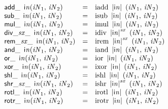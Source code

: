 \vspace{1ex}

$$
\begin{array}{@{}lcl@{}l@{}}
{{\mathsf{add}}{\mathsf{\_}}~\,{\mathsf{i}}{{\mathit{n}}}}{({\mathit{iN}}_{{1}},\, {\mathit{iN}}_{{2}})} &=& {\mathrm{iadd}}~\,{|{\mathsf{i}}{{\mathit{n}}}|}~\,({\mathit{iN}}_{{1}},\, {\mathit{iN}}_{{2}}) &  \\
{{\mathsf{sub}}{\mathsf{\_}}~\,{\mathsf{i}}{{\mathit{n}}}}{({\mathit{iN}}_{{1}},\, {\mathit{iN}}_{{2}})} &=& {\mathrm{isub}}~\,{|{\mathsf{i}}{{\mathit{n}}}|}~\,({\mathit{iN}}_{{1}},\, {\mathit{iN}}_{{2}}) &  \\
{{\mathsf{mul}}{\mathsf{\_}}~\,{\mathsf{i}}{{\mathit{n}}}}{({\mathit{iN}}_{{1}},\, {\mathit{iN}}_{{2}})} &=& {\mathrm{imul}}~\,{|{\mathsf{i}}{{\mathit{n}}}|}~\,({\mathit{iN}}_{{1}},\, {\mathit{iN}}_{{2}}) &  \\
{{{\mathsf{div\_}}{{\mathit{sx}}}}{\mathsf{\_}}~\,{\mathsf{i}}{{\mathit{n}}}}{({\mathit{iN}}_{{1}},\, {\mathit{iN}}_{{2}})} &=& {\mathrm{idiv}}~\,{{|{\mathsf{i}}{{\mathit{n}}}|}^{{\mathit{sx}}}}~\,({\mathit{iN}}_{{1}},\, {\mathit{iN}}_{{2}}) &  \\
{{{\mathsf{rem\_}}{{\mathit{sx}}}}{\mathsf{\_}}~\,{\mathsf{i}}{{\mathit{n}}}}{({\mathit{iN}}_{{1}},\, {\mathit{iN}}_{{2}})} &=& {\mathrm{irem}}~\,{{|{\mathsf{i}}{{\mathit{n}}}|}^{{\mathit{sx}}}}~\,({\mathit{iN}}_{{1}},\, {\mathit{iN}}_{{2}}) &  \\
{{\mathsf{and}}{\mathsf{\_}}~\,{\mathsf{i}}{{\mathit{n}}}}{({\mathit{iN}}_{{1}},\, {\mathit{iN}}_{{2}})} &=& {\mathrm{iand}}~\,{|{\mathsf{i}}{{\mathit{n}}}|}~\,({\mathit{iN}}_{{1}},\, {\mathit{iN}}_{{2}}) &  \\
{{\mathsf{or}}{\mathsf{\_}}~\,{\mathsf{i}}{{\mathit{n}}}}{({\mathit{iN}}_{{1}},\, {\mathit{iN}}_{{2}})} &=& {\mathrm{ior}}~\,{|{\mathsf{i}}{{\mathit{n}}}|}~\,({\mathit{iN}}_{{1}},\, {\mathit{iN}}_{{2}}) &  \\
{{\mathsf{xor}}{\mathsf{\_}}~\,{\mathsf{i}}{{\mathit{n}}}}{({\mathit{iN}}_{{1}},\, {\mathit{iN}}_{{2}})} &=& {\mathrm{ixor}}~\,{|{\mathsf{i}}{{\mathit{n}}}|}~\,({\mathit{iN}}_{{1}},\, {\mathit{iN}}_{{2}}) &  \\
{{\mathsf{shl}}{\mathsf{\_}}~\,{\mathsf{i}}{{\mathit{n}}}}{({\mathit{iN}}_{{1}},\, {\mathit{iN}}_{{2}})} &=& {\mathrm{ishl}}~\,{|{\mathsf{i}}{{\mathit{n}}}|}~\,({\mathit{iN}}_{{1}},\, {\mathit{iN}}_{{2}}) &  \\
{{{\mathsf{shr\_}}{{\mathit{sx}}}}{\mathsf{\_}}~\,{\mathsf{i}}{{\mathit{n}}}}{({\mathit{iN}}_{{1}},\, {\mathit{iN}}_{{2}})} &=& {\mathrm{ishr}}~\,{{|{\mathsf{i}}{{\mathit{n}}}|}^{{\mathit{sx}}}}~\,({\mathit{iN}}_{{1}},\, {\mathit{iN}}_{{2}}) &  \\
{{\mathsf{rotl}}{\mathsf{\_}}~\,{\mathsf{i}}{{\mathit{n}}}}{({\mathit{iN}}_{{1}},\, {\mathit{iN}}_{{2}})} &=& {\mathrm{irotl}}~\,{|{\mathsf{i}}{{\mathit{n}}}|}~\,({\mathit{iN}}_{{1}},\, {\mathit{iN}}_{{2}}) &  \\
{{\mathsf{rotr}}{\mathsf{\_}}~\,{\mathsf{i}}{{\mathit{n}}}}{({\mathit{iN}}_{{1}},\, {\mathit{iN}}_{{2}})} &=& {\mathrm{irotr}}~\,{|{\mathsf{i}}{{\mathit{n}}}|}~\,({\mathit{iN}}_{{1}},\, {\mathit{iN}}_{{2}}) &  \\
\end{array}
$$

